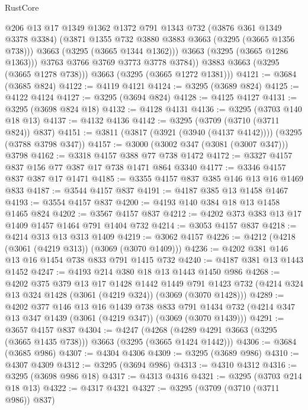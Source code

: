 \begin{lexlean}{RustCore}
\begin{coremodule}
                @206
                @13
                @17
                @1349
                @1362
                @1372
                @791
                @1343
                @732
                (@3876 @361 @1349 @3378 @3384)
                (@3871 @1355 @732 @3880 @3883 @3663 (@3295 (@3665 @1356 @738)))
                @3663
                (@3295 (@3665 @1344 @1362)))
              @3663
              (@3295 (@3665 @1286 @1363)))
            @3763
            @3766
            @3769
            @3773
            @3778
            @3784))
        @3883
        @3663
        (@3295 (@3665 @1278 @738)))
      @3663
      (@3295 (@3665 @1272 @1381)))
@4121 := @3684 (@3685 @824)
@4122 := @4119 @4121
@4124 := @3295 (@3689 @824)
@4125 := @4122 @4124
@4127 := @3295 (@3694 @824)
@4128 := @4125 @4127
@4131 := @3295 (@3698 @824 @18)
@4132 := @4128 @4131
@4136 := @3295 (@3703 @140 @18 @13)
@4137 := @4132 @4136
@4142 := @3295 (@3709 (@3710 (@3711 @824)) @837)
@4151 := @3811 (@3817 (@3921 (@3940 (@4137 @4142)))) (@3295 (@3788 @3798 @347))
@4157 := @3000 (@3002 @347 (@3081 (@3007 @347))) @3798
@4162 := @3318 @4157 @388 @77 @738 @1472
@4172 := @3327 @4157 @837 @156 @77 @387 @17 @738 @1471 @864 @3340
@4177 := @3346 @4157 @837 @387 @17 @1471
@4185 := @3355 @4157 @837 @385 @146 @13 @16 @1469 @833
@4187 := @3544 @4157 @837
@4191 := @4187 @385 @13 @1458 @1467
@4193 := @3554 @4157 @837
@4200 := @4193 @140 @384 @18 @13 @1458 @1465 @824
@4202 := @3567 @4157 @837
@4212 := @4202 @373 @383 @13 @17 @1409 @1457 @1464 @791 @1404 @732
@4214 := @3053 @4157 @837
@4218 := @4214 @313 @13 @313 @1409
@4219 := @3062 @4157
@4226 := @4212 (@4218 (@3061 (@4219 @313)) (@3069 (@3070 @1409)))
@4236 := @4202 @381 @146 @13 @16 @1454 @738 @833 @791 @1415 @732
@4240 := @4187 @381 @13 @1443 @1452
@4247 := @4193 @214 @380 @18 @13 @1443 @1450 @986
@4268 := @4202
    @375
    @379
    @13
    @17
    @1428
    @1442
    @1449
    @791
    @1423
    @732
    (@4214 @324 @13 @324 @1428 (@3061 (@4219 @324)) (@3069 (@3070 @1428)))
@4289 := @4202
    @377
    @146
    @13
    @16
    @1439
    @738
    @833
    @791
    @1434
    @732
    (@4214 @347 @13 @347 @1439 (@3061 (@4219 @347)) (@3069 (@3070 @1439)))
@4291 := @3657 @4157 @837
@4304 := @4247
    (@4268 (@4289 @4291 @3663 (@3295 (@3665 @1435 @738))) @3663 (@3295 (@3665 @1424 @1442)))
@4306 := @3684 (@3685 @986)
@4307 := @4304 @4306
@4309 := @3295 (@3689 @986)
@4310 := @4307 @4309
@4312 := @3295 (@3694 @986)
@4313 := @4310 @4312
@4316 := @3295 (@3698 @986 @18)
@4317 := @4313 @4316
@4321 := @3295 (@3703 @214 @18 @13)
@4322 := @4317 @4321
@4327 := @3295 (@3709 (@3710 (@3711 @986)) @837)

\end{coremodule}
\end{lexlean}
